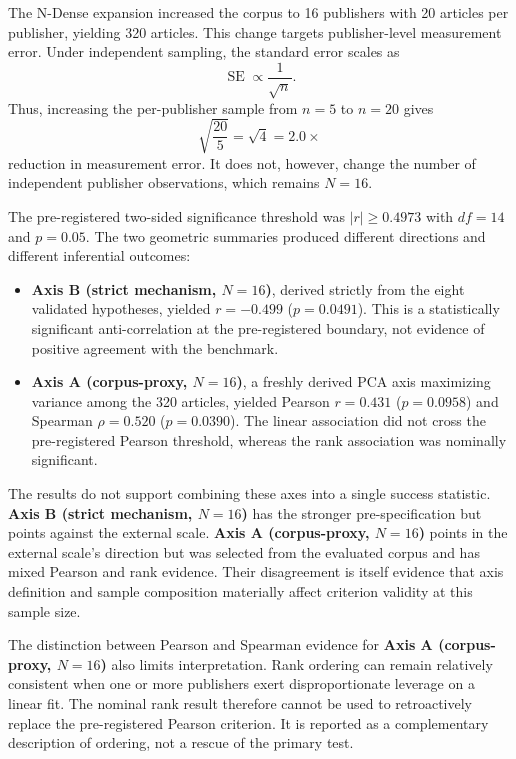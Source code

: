 The N-Dense expansion increased the corpus to 16 publishers with 20 articles per publisher,
yielding 320 articles. This change targets publisher-level measurement error. Under independent
sampling, the standard error scales as
\begin{equation}
    \operatorname{SE}\propto\frac{1}{\sqrt{n}}.
\end{equation}
Thus, increasing the per-publisher sample from $n=5$ to $n=20$ gives
\begin{equation}
    \sqrt{\frac{20}{5}}=\sqrt{4}=2.0\times
\end{equation}
reduction in measurement error. It does not, however, change the number of independent
publisher observations, which remains $N=16$.

The pre-registered two-sided significance threshold was $|r|\geq0.4973$ with $df=14$ and
$p=0.05$. The two geometric summaries produced different directions and different inferential
outcomes:

\begin{itemize}
    \item \textbf{Axis B (strict mechanism, $N=16$)}, derived strictly from the eight
    validated hypotheses, yielded $r=-0.499$ ($p=0.0491$). This is a statistically significant
    anti-correlation at the pre-registered boundary, not evidence of positive agreement with the
    benchmark.

    \item \textbf{Axis A (corpus-proxy, $N=16$)}, a freshly derived PCA axis maximizing
    variance among the 320 articles, yielded Pearson $r=0.431$ ($p=0.0958$) and Spearman
    $\rho=0.520$ ($p=0.0390$). The linear association did not cross the pre-registered Pearson
    threshold, whereas the rank association was nominally significant.
\end{itemize}

The results do not support combining these axes into a single success statistic. \textbf{Axis B
(strict mechanism, $N=16$)} has the stronger pre-specification but points against the external
scale. \textbf{Axis A (corpus-proxy, $N=16$)} points in the external scale's direction but was
selected from the evaluated corpus and has mixed Pearson and rank evidence. Their disagreement
is itself evidence that axis definition and sample composition materially affect criterion
validity at this sample size.

The distinction between Pearson and Spearman evidence for \textbf{Axis A (corpus-proxy,
$N=16$)} also limits interpretation. Rank ordering can remain relatively consistent when one or
more publishers exert disproportionate leverage on a linear fit. The nominal rank result
therefore cannot be used to retroactively replace the pre-registered Pearson criterion. It is
reported as a complementary description of ordering, not a rescue of the primary test.

